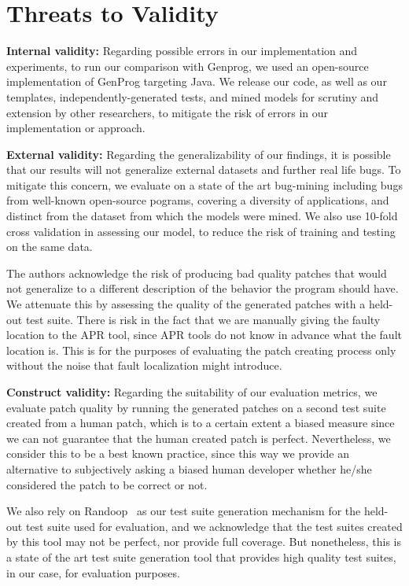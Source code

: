 \documentclass[conference]{IEEEtran}
\begin{document}
\section{Threats to Validity} \label{threatsVal}

\noindent\textbf{Internal validity:}
Regarding possible errors in our implementation and experiments, to run our
comparison with Genprog, we used an open-source implementation of GenProg
targeting Java. We release our code, as well as our templates,
independently-generated tests, and mined models for scrutiny and extension by other
researchers, to mitigate the risk of errors in our implementation or approach. 

\noindent\textbf{External validity:} 
Regarding the generalizability of our findings, it is possible 
that our results will not generalize external datasets and further
real life bugs. To mitigate this concern, we evaluate 
on a state of the art bug-mining including bugs from well-known open-source
pograms, covering a diversity of applications, and distinct from the dataset
from which the models were mined.  We also use 10-fold cross validation in
assessing our model, to reduce the risk of training and testing on the same
data.  

The authors acknowledge the risk of producing bad quality patches that would not generalize
to a different description of the behavior the program should have. We attenuate this by 
assessing the quality of the generated patches with a held-out test suite.
There is risk in the fact that we are manually giving the
faulty location to the APR tool, since APR tools do not know in advance what the 
fault location is. This is for the purposes of evaluating the patch creating process
only without the noise that fault localization might introduce.

\noindent\textbf{Construct validity:}
Regarding the suitability of our evaluation metrics, we evaluate patch
quality by running the generated patches on a second test suite created
from a human patch, which is to a certain extent a biased measure since we can
not guarantee that the human created patch is perfect. Nevertheless, we consider this to be a
best known practice, since this way we provide an alternative to subjectively asking a biased human developer
whether he/she considered the patch to be correct or not. 

We also rely on Randoop~\cite{pacheco07} as our test suite generation mechanism for the held-out test suite used for evaluation, and we acknowledge that the test suites created by this tool may not be perfect, nor provide full coverage. But nonetheless, this is a state of the art test suite generation tool that provides high quality test suites, in our case, for evaluation purposes.
\end{document}
